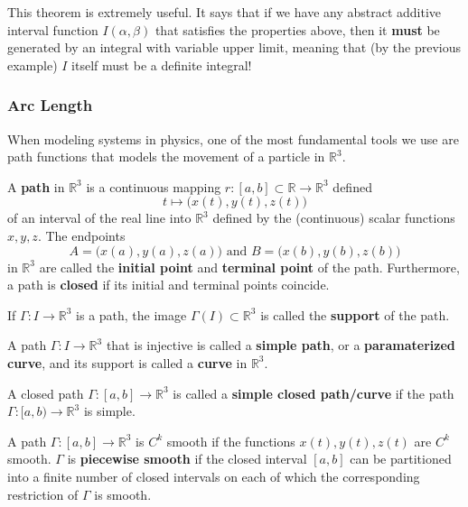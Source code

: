     This theorem is extremely useful. It says that if we have any abstract additive interval function $I(\alpha, \beta)$ that satisfies the properties above, then it \textbf{must} be generated by an integral with variable upper limit, meaning that (by the previous example) $I$ itself must be a definite integral! 

    \subsubsection{Arc Length}
    When modeling systems in physics, one of the most fundamental tools we use are path functions that models the movement of a particle in $\mathbb{R}^3$. 

    \begin{definition}[Path]
      A \textbf{path} in $\mathbb{R}^3$ is a continuous mapping $r: [a, b] \subset \mathbb{R} \longrightarrow \mathbb{R}^3$ defined
      \[t \mapsto \big(x(t), y(t), z(t)\big)\]
      of an interval of the real line into $\mathbb{R}^3$ defined by the (continuous) scalar functions $x, y, z$. The endpoints 
      \[A = \big(x(a), y(a), z(a)\big) \text{ and } B = \big(x(b), y(b), z(b)\big)\]
      in $\mathbb{R}^3$ are called the \textbf{initial point} and \textbf{terminal point} of the path. Furthermore, a path is \textbf{closed} if its initial and terminal points coincide. 
    \end{definition}

    \begin{definition}[Support]
      If $\Gamma: I \longrightarrow \mathbb{R}^3$ is a path, the image $\Gamma(I) \subset \mathbb{R}^3$ is called the \textbf{support} of the path. 
    \end{definition}

    \begin{definition}
      A path $\Gamma: I \longrightarrow \mathbb{R}^3$ that is injective is called a \textbf{simple path}, or a \textbf{paramaterized curve}, and its support is called a \textbf{curve} in $\mathbb{R}^3$. 

      A closed path $\Gamma: [a, b] \longrightarrow \mathbb{R}^3$ is called a \textbf{simple closed path/curve} if the path $\Gamma: [a, b) \longrightarrow \mathbb{R}^3$ is simple. 
    \end{definition}

    \begin{definition}
      A path $\Gamma: [a, b] \longrightarrow \mathbb{R}^3$ is $C^k$ smooth if the functions $x(t), y(t), z(t)$ are $C^k$ smooth. $\Gamma$ is \textbf{piecewise smooth} if the closed interval $[a, b]$ can be partitioned into a finite number of closed intervals on each of which the corresponding restriction of $\Gamma$ is smooth. 
    \end{definition}


